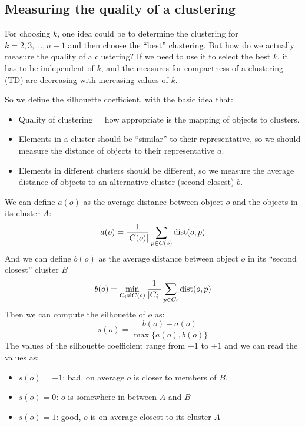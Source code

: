     \subsection{Measuring the quality of a clustering}
    For choosing $k$, one idea could be to determine the clustering for 
    $k=2,3,\dots,n-1$ and then choose the ``best'' clustering. But how do we 
    actually measure the quality of a clustering? If we need to use it to 
    select the best $k$, it has to be independent of $k$, and the measures for 
    compactness of a clustering (TD) are decreasing with increasing values of 
    $k$.
    
    So we define the silhouette coefficient, with the basic idea that:
    \begin{itemize}
        \item Quality of clustering = how appropriate is the mapping of objects 
        to clusters.
        \item Elements in a cluster should be ``similar'' to their 
        representative, so we should measure the distance of objects to their 
        representative $a$.
        \item Elements in different clusters should be different, so we measure 
        the average distance of objects to an alternative cluster (second 
        closest) $b$.
    \end{itemize}
    We can define $a(o)$ as the average distance between object $o$ and the 
    objects in its cluster $A$:
    \begin{equation*}
        a(o)=\frac{1}{|C(o)|} \sum_{p\in C(o)} \text{dist}(o,p)
    \end{equation*}
    And we can define $b(o)$ as the average distance between object $o$ in its 
    ``second closest'' cluster $B$
    \begin{equation*}
        b(o)=\min_{C_i \neq C(o)} \frac{1}{|C_i|} \sum_{p\in C_i} \text{dist}(o,p)
    \end{equation*}
    Then we can compute the silhouette of $o$ as:
    \begin{equation*}
        s(o)=\frac{b(o)-a(o)}{\max\{a(o),b(o)\}}
    \end{equation*}
    The values of the silhouette coefficient range from $-1$ to $+1$ and we can 
    read the values as:
    \begin{itemize}
        \item $s(o)=-1$: bad, on average $o$ is closer to members of $B$.
        \item $s(o)=0$: $o$ is somewhere in-between $A$ and $B$
        \item $s(o)=1$: good, $o$ is on average closest to its cluster $A$
    \end{itemize}

